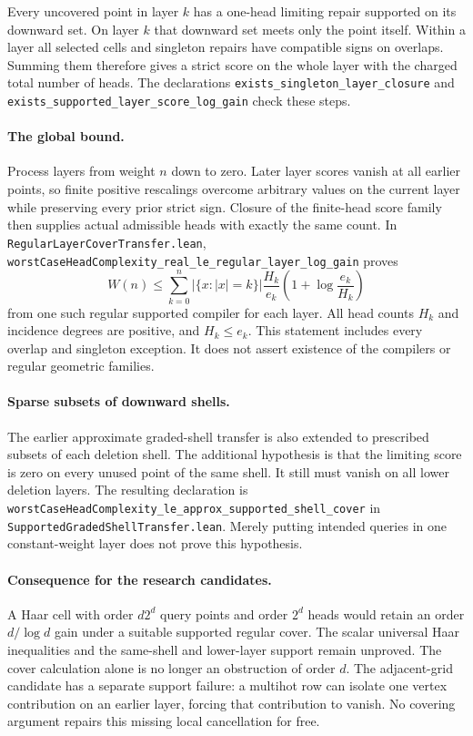 \documentclass{article}
\begin{document}
Every uncovered point in layer $k$ has a one-head limiting repair supported
on its downward set. On layer $k$ that downward set meets only the point
itself. Within a layer all selected cells and singleton repairs have
compatible signs on overlaps. Summing them therefore gives a strict score
on the whole layer with the charged total number of heads. The declarations
\texttt{exists\_singleton\_layer\_closure} and
\texttt{exists\_supported\_layer\_score\_log\_gain} check these steps.

\paragraph{The global bound.}
Process layers from weight $n$ down to zero. Later layer scores vanish at
all earlier points, so finite positive rescalings overcome arbitrary values
on the current layer while preserving every prior strict sign. Closure of
the finite-head score family then supplies actual admissible heads with
exactly the same count. In \texttt{RegularLayerCoverTransfer.lean},
\texttt{worstCaseHeadComplexity\_real\_le\_regular\_layer\_log\_gain}
proves
\[
 W(n)\leq\sum_{k=0}^{n}|\{x:|x|=k\}|
 \frac{H_k}{e_k}\left(1+\log\frac{e_k}{H_k}\right)
\]
from one such regular supported compiler for each layer. All head counts
$H_k$ and incidence degrees are positive, and $H_k\leq e_k$.
This statement includes every overlap and singleton exception. It does not
assert existence of the compilers or regular geometric families.

\paragraph{Sparse subsets of downward shells.}
The earlier approximate graded-shell transfer is also extended to prescribed
subsets of each deletion shell. The additional hypothesis is that the
limiting score is zero on every unused point of the same shell. It still
must vanish on all lower deletion layers. The resulting declaration is
\texttt{worstCaseHeadComplexity\_le\_approx\_supported\_shell\_cover}
in \texttt{SupportedGradedShellTransfer.lean}. Merely putting intended
queries in one constant-weight layer does not prove this hypothesis.

\paragraph{Consequence for the research candidates.}
A Haar cell with order $d2^d$ query points and order $2^d$ heads would retain
an order $d/\log d$ gain under a suitable supported regular cover. The
scalar universal Haar inequalities and the same-shell and lower-layer
support remain unproved. The cover calculation alone is no longer an
obstruction of order $d$. The adjacent-grid candidate has a separate
support failure: a multihot row can isolate one vertex contribution on an
earlier layer, forcing that contribution to vanish. No covering argument
repairs this missing local cancellation for free.
\end{document}
